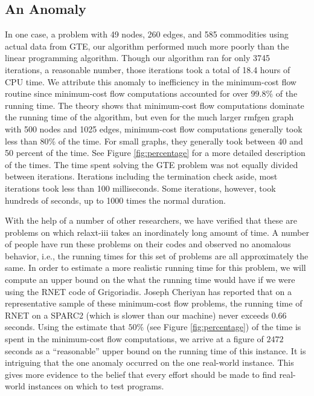 \subsection{An Anomaly}
\label{sec:anomaly}
In one case, a problem with 49 nodes, 260 edges, and 585 commodities
using actual data from GTE, our algorithm performed much more poorly 
than the linear programming algorithm.
Though our algorithm ran for only 3745 iterations, a reasonable number,
those iterations took a total of 18.4 hours of CPU time.
We attribute this anomaly to inefficiency in the minimum-cost flow routine
since minimum-cost flow computations accounted for over $99.8\%$ of the
running time.
The theory shows that minimum-cost flow computations dominate 
the running time of the algorithm, 
but even for the much larger {\sc rmfgen} graph with 500 nodes and 1025 edges,
minimum-cost flow computations generally took less than $80\%$ of the time.
For small graphs, they generally took between 40 and 50 percent of the
time.
See Figure \ref{fig:percentage} for a more detailed description of the times.
The time spent solving the GTE problem was not equally divided 
between iterations.
Iterations including the termination check aside, 
most iterations took less than 100 milliseconds. 
Some iterations, however, took hundreds of seconds, 
up to 1000 times the normal duration.
\iffalse ============== REPLACED WITH BELOW
The long iterations may involve universally difficult minimum-cost flow
problems, or they may mark instances which confound the particular
routine used in our implementation.
A better minimum-cost flow routine would improve our algorithm,
not only for this problem but for concurrent flow problems in general.
With one exception, which might be remedied with a minimum-cost flow
routine tailored to our algorithm,
our results show that our algorithm works well in practice.
It can efficiently solve concurrent, and therefore multicommodity flow,
problems when exact solutions are not needed.
======================\fi

With the help of a number of 
other researchers, we have verified that these are
problems on which {\sc relaxt-iii} takes an inordinately long amount of
time.  A number of people have run these problems on their codes and
observed no anomalous behavior, i.e., the running times for this set of
problems are all approximately the same.  In order to estimate a more
realistic running time for this problem, we will compute an upper
bound on the what the running time would have if we were using the
RNET code of Grigoriadis.  Joseph Cheriyan \cite{Cheriyan91} has
reported that on a representative sample of these  minimum-cost flow
problems,
the running time of RNET on a SPARC2 (which is slower than our
machine) never exceeds $0.66$ seconds.  Using the estimate that $50\%$
(see Figure \ref{fig:percentage})
of the time is spent in the minimum-cost flow computations, we arrive
at a figure of $2472$ seconds as a ``reasonable'' upper bound on the
running time of this instance.  It is intriguing that the one anomaly
occurred on the one real-world instance.  This gives more evidence to
the belief that 
every effort should be made to find real-world instances on which to
test programs.


